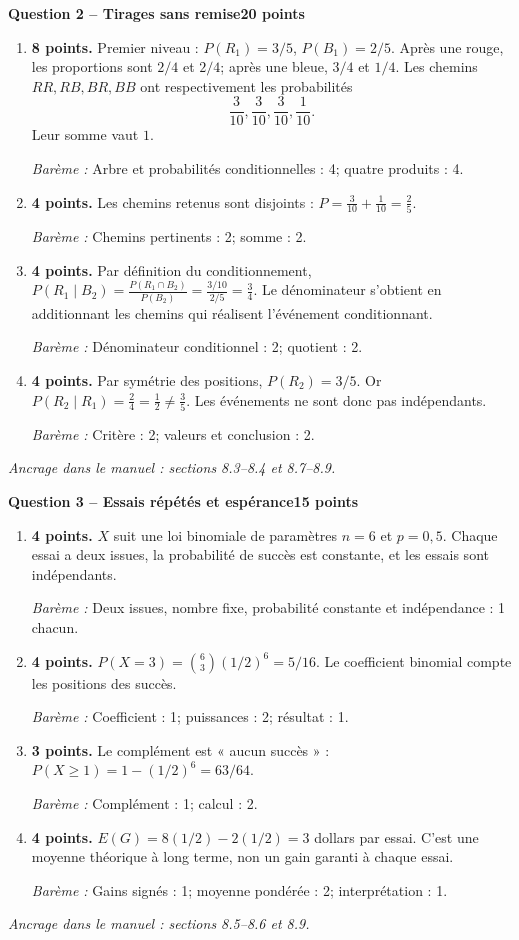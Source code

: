 \documentclass[11pt,a4paper]{article}
\begin{document}
\newpage
{\large\bfseries Question 2 -- Tirages sans remise}\hfill\textbf{20 points}\par
\begin{enumerate}
\item \textbf{8 points.} Premier niveau : \(P(R_1)=3/5\), \(P(B_1)=2/5\). Après une rouge, les proportions sont \(2/4\) et \(2/4\); après une bleue, \(3/4\) et \(1/4\). Les chemins \(RR,RB,BR,BB\) ont respectivement les probabilités \[\frac3{10},\frac3{10},\frac3{10},\frac1{10}.\] Leur somme vaut \(1\).
\par{\small\textit{Barème : }Arbre et probabilités conditionnelles : 4; quatre produits : 4.}
\item \textbf{4 points.} Les chemins retenus sont disjoints : \(P=\frac3{10}+\frac1{10}=\frac25\).
\par{\small\textit{Barème : }Chemins pertinents : 2; somme : 2.}
\item \textbf{4 points.} Par définition du conditionnement, \(P(R_1\mid B_2)=\frac{P(R_1\cap B_2)}{P(B_2)}=\frac{3/10}{2/5}=\frac34\). Le dénominateur s’obtient en additionnant les chemins qui réalisent l’événement conditionnant.
\par{\small\textit{Barème : }Dénominateur conditionnel : 2; quotient : 2.}
\item \textbf{4 points.} Par symétrie des positions, \(P(R_2)=3/5\). Or \(P(R_2\mid R_1)=\frac24=\frac12\ne\frac35\). Les événements ne sont donc pas indépendants.
\par{\small\textit{Barème : }Critère : 2; valeurs et conclusion : 2.}
\end{enumerate}
\vfill {\small\textit{Ancrage dans le manuel : sections 8.3--8.4 et 8.7--8.9.}}

\newpage
{\large\bfseries Question 3 -- Essais répétés et espérance}\hfill\textbf{15 points}\par
\begin{enumerate}
\item \textbf{4 points.} \(X\) suit une loi binomiale de paramètres \(n=6\) et \(p=0{,}5\). Chaque essai a deux issues, la probabilité de succès est constante, et les essais sont indépendants.
\par{\small\textit{Barème : }Deux issues, nombre fixe, probabilité constante et indépendance : 1 chacun.}
\item \textbf{4 points.} \(P(X=3)=\binom63(1/2)^6=5/16\). Le coefficient binomial compte les positions des succès.
\par{\small\textit{Barème : }Coefficient : 1; puissances : 2; résultat : 1.}
\item \textbf{3 points.} Le complément est « aucun succès » : \(P(X\ge1)=1-(1/2)^6=63/64\).
\par{\small\textit{Barème : }Complément : 1; calcul : 2.}
\item \textbf{4 points.} \(E(G)=8(1/2)-2(1/2)=3\) dollars par essai. C’est une moyenne théorique à long terme, non un gain garanti à chaque essai.
\par{\small\textit{Barème : }Gains signés : 1; moyenne pondérée : 2; interprétation : 1.}
\end{enumerate}
\vfill {\small\textit{Ancrage dans le manuel : sections 8.5--8.6 et 8.9.}}
\end{document}
